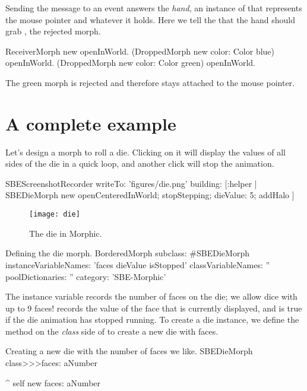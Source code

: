\documentclass[a4paper,10pt,twoside]{book}
\begin{document}
Sending the  message to an event answers the \emph{hand}, an instance of  that represents the mouse pointer and whatever it holds.
Here we tell the  that the hand should grab , the rejected morph.

\begin{code}{}
ReceiverMorph new openInWorld.
(DroppedMorph new color: Color blue) openInWorld.
(DroppedMorph new color: Color green) openInWorld.
\end{code}
\noindent
The green morph is rejected and therefore stays attached to the mouse pointer.

\section{A complete example}

Let's design a morph to roll a die.
Clicking on it will display the values of all sides of the die in a quick loop, and another click will stop the animation.

\begin{ExecuteSmalltalkScript}
SBEScreenshotRecorder writeTo: 'figures/die.png' building: [:helper |
	SBEDieMorph new
		openCenteredInWorld;
		stopStepping;
		dieValue: 5;
		addHalo
]
\end{ExecuteSmalltalkScript}
\begin{figure}[ht]
	\centerline{\texttt{[image: die]}}
	\caption{The die in Morphic.
		\label{fig:dialogDie}}
\end{figure}


\begin{classdef}{Defining the die morph.}
BorderedMorph subclass: #SBEDieMorph
	instanceVariableNames: 'faces dieValue isStopped'
	classVariableNames: ''
	poolDictionaries: ''
	category: 'SBE-Morphic'
\end{classdef}

The instance variable  records the number of faces on the die; we allow dice with up to 9 faces!
 records the value of the face that is currently displayed, and  is true if the die animation has stopped running.
To create a die instance, we define the  method on the \emph{class} side of  to create a new die with  faces.
\begin{method}{Creating a new die with the number of faces we like.}
SBEDieMorph class>>>faces: aNumber

	^ self new faces: aNumber
\end{method}
\end{document}
